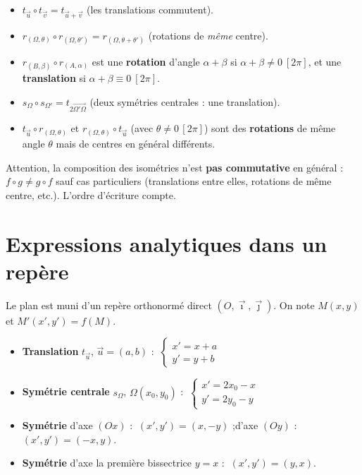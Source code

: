 \begin{propriete}
\begin{itemize}
\item $t_{\vec u}\circ t_{\vec v}=t_{\vec u+\vec v}$ (les translations commutent).
\item $r_{(\Omega,\theta)}\circ r_{(\Omega,\theta')}=r_{(\Omega,\theta+\theta')}$ (rotations de \emph{même} centre).
\item $r_{(B,\beta)}\circ r_{(A,\alpha)}$ est une \textbf{rotation} d'angle $\alpha+\beta$ si $\alpha+\beta\neq0\ [2\pi]$, et une \textbf{translation} si $\alpha+\beta\equiv0\ [2\pi]$.
\item $s_\Omega\circ s_{\Omega'}=t_{2\overrightarrow{\Omega'\Omega}}$ (deux symétries centrales : une translation).
\item $t_{\vec u}\circ r_{(\Omega,\theta)}$ et $r_{(\Omega,\theta)}\circ t_{\vec u}$ (avec $\theta\neq0\,[2\pi]$) sont des \textbf{rotations} de même angle $\theta$ mais de centres en général différents.
\end{itemize}
\end{propriete}

\begin{remarque}
Attention, la composition des isométries n'est \textbf{pas commutative} en général : $f\circ g\neq g\circ f$ sauf cas particuliers (translations entre elles, rotations de même centre, etc.). L'ordre d'écriture compte.
\end{remarque}

\section{Expressions analytiques dans un repère}

Le plan est muni d'un repère orthonormé direct $(O,\vec\imath,\vec\jmath)$. On note $M(x,y)$ et $M'(x',y')=f(M)$.

\begin{propriete}
\begin{itemize}
\item \textbf{Translation} $t_{\vec u}$, $\vec u=(a,b)$ : $\ \begin{cases}x'=x+a\\ y'=y+b\end{cases}$
\item \textbf{Symétrie centrale} $s_\Omega$, $\Omega(x_0,y_0)$ : $\ \begin{cases}x'=2x_0-x\\ y'=2y_0-y\end{cases}$
\item \textbf{Symétrie} d'axe $(Ox)$ : $\ (x',y')=(x,-y)$ ;\quad d'axe $(Oy)$ : $(x',y')=(-x,y)$.
\item \textbf{Symétrie} d'axe la première bissectrice $y=x$ : $\ (x',y')=(y,x)$.
\end{itemize}
\end{propriete}

